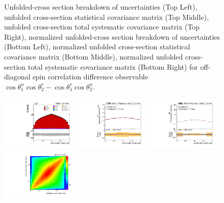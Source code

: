 \begin{refsection}
\begin{figure}[htb]
\begin{center}
\caption{Unfolded-cross section breakdown of uncertainties (Top Left), unfolded cross-section statistical covariance matrix (Top Middle), unfolded cross-section total systematic covariance matrix (Top Right), normalized unfolded-cross section breakdown of uncertainties (Bottom Left), normalized unfolded cross-section statistical covariance matrix (Bottom Middle), normalized unfolded cross-section total systematic covariance matrix (Bottom Right) for off-diagonal spin correlation difference observable $\cos\theta_{1}^{n}\cos\theta_{2}^{r}-\cos\theta_{1}^{r}\cos\theta_{2}^{n}$.}
\label{fig:c_Mnr_uncertainties}
\end{center}
\end{figure}
\clearpage
\begin{figure}[htb]
\begin{center}
 \includegraphics[width=0.32\textwidth]{fig_fullRun2UL/controlplots/combined/Hyp_LLBarCPnk.pdf}
 \includegraphics[width=0.32\textwidth]{fig_fullRun2UL/unfolding/combined/UnfoldedResults_c_Pnk.pdf}
 \includegraphics[width=0.32\textwidth]{fig_fullRun2UL/unfolding/combined/UnfoldedResultsNorm_c_Pnk.pdf} \\
 \includegraphics[width=0.32\textwidth]{fig_fullRun2UL/unfolding/combined/ResponseMatrix_c_Pnk.pdf}

\end{center}
\end{figure}
\end{refsection}
